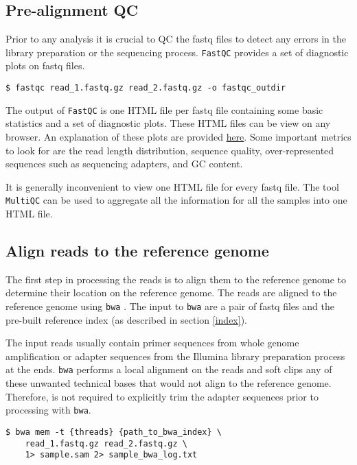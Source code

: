 \documentclass[11pt]{article}
\newcommand{\prog}[1]{\texttt{#1}}
\begin{document}
\subsection{Pre-alignment QC}
Prior to any analysis it is crucial to QC the fastq files to detect any
errors in the library preparation or the sequencing process.
\prog{FastQC} provides a set of diagnostic plots on fastq files.
\begin{verbatim}
$ fastqc read_1.fastq.gz read_2.fastq.gz -o fastqc_outdir
\end{verbatim}

The output of \prog{FastQC} is one HTML file per fastq file containing
some basic statistics and a set of diagnostic plots.
These HTML files can be view on any browser. An explanation of these
plots are provided
\href{https://www.bioinformatics.babraham.ac.uk/projects/fastqc/}{here}.
Some important metrics to look for are the read length distribution,
sequence quality, over-represented sequences such as sequencing
adapters, and GC content.

It is generally inconvenient to view one HTML file for every fastq
file. The tool \prog{MultiQC} can be used to aggregate all the
information for all the samples into one HTML file.

\subsection{Align reads to the reference genome}
The first step in processing the reads is to align them to the reference
genome to determine their location on the reference genome.
The reads are aligned to the reference genome using \prog{bwa}
\citep{li2013aligning}.
The input to \prog{bwa} are a pair of fastq files and the pre-built
reference index (as described in section \ref{index}).

The input reads usually contain primer sequences from whole genome
amplification or adapter sequences from the Illumina library preparation
process at the ends. \prog{bwa} performs a local alignment on the reads
and soft clips any of these unwanted technical bases that would not
align to the reference genome. Therefore, is not required to explicitly
trim the adapter sequences prior to processing with \prog{bwa}.

\begin{verbatim}
$ bwa mem -t {threads} {path_to_bwa_index} \
    read_1.fastq.gz read_2.fastq.gz \
    1> sample.sam 2> sample_bwa_log.txt
\end{verbatim}
\end{document}
